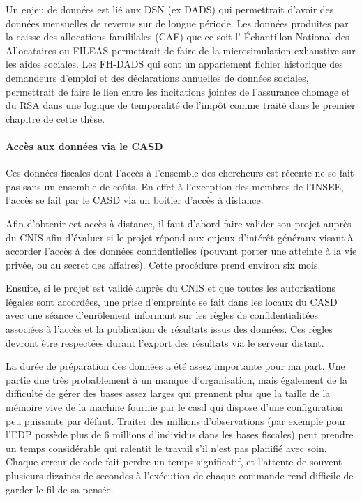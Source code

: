 Un enjeu de données est lié aux DSN (ex DADS) qui permettrait d'avoir
des données mensuelles de revenus sur de longue période. Les données
produites par la caisse des allocations famililales (CAF) que ce soit l'
Échantillon National des Allocataires ou FILEAS permettrait de faire de
la microsimulation exhaustive sur les aides sociales. Les FH-DADS qui
sont un appariement fichier historique des demandeurs d'emploi et des
déclarations annuelles de données sociales, permettrait de faire le lien
entre les incitations jointes de l'assurance chomage et du RSA dans une
logique de temporalité de l'impôt comme traité dans le premier chapitre
de cette thèse.

\paragraph{Accès aux données via le
CASD}\label{accuxe8s-aux-donnuxe9es-via-le-casd}

Ces données fiscales dont l'accès à l'ensemble des chercheurs est
récente ne se fait pas sans un ensemble de coûts. En effet à l'exception
des membres de l'INSEE, l'accès se fait par le CASD via un boitier
d'accès à distance.

Afin d'obtenir cet accès à distance, il faut d'abord faire valider son
projet auprès du CNIS afin d'évaluer si le projet répond aux enjeux
d'intérêt généraux visant à accorder l'accès à des données
confidentielles (pouvant porter une atteinte à la vie privée, ou au
secret des affaires). Cette procédure prend environ six mois.

Ensuite, si le projet est validé auprès du CNIS et que toutes les
autorisations légales sont accordées, une prise d'empreinte se fait dans
les locaux du CASD avec une séance d'enrôlement informant sur les règles
de confidentialitées associées à l'accès et la publication de résultats
issus des données. Ces règles devront être respectées durant l'export
des résultats via le serveur distant.

La durée de préparation des données a été assez importante pour ma part.
Une partie due très probablement à un manque d'organisation, mais
également de la difficulté de gérer des bases assez larges qui prennent
plus que la taille de la mémoire vive de la machine fournie par le casd
qui dispose d'une configuration peu puissante par défaut. Traiter des
millions d'observations (par exemple pour l'EDP possède plus de 6
millions d'individus dans les bases fiscales) peut prendre un temps
considérable qui ralentit le travail s'il n'est pas planifié avec soin.
Chaque erreur de code fait perdre un temps significatif, et l'attente de
souvent plusieurs dizaines de secondes à l'exécution de chaque commande
rend difficile de garder le fil de sa pensée.

